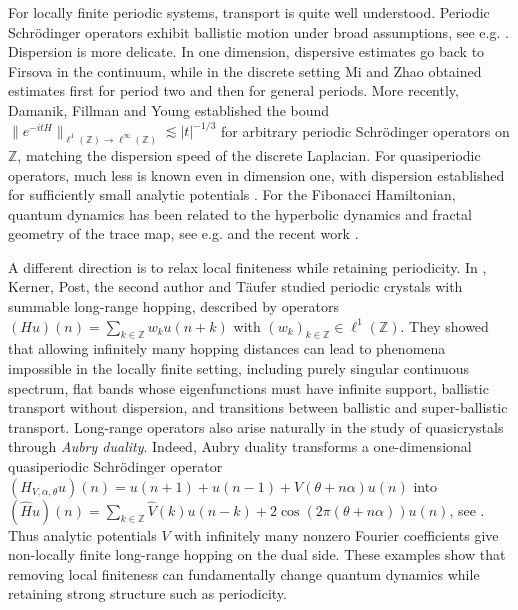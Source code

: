 \documentclass[11pt]{amsart}
\theoremstyle{plain}
\theoremstyle{definition}
\numberwithin{equation}{section}
\begin{document}
For locally finite periodic systems, transport is quite well understood. Periodic Schr\"odinger operators exhibit ballistic motion under broad assumptions, see e.g. \cite{DamanikLukicYessen,FillmanPeriodic,BoutetdeMonvelSabri}. Dispersion is more delicate. In one dimension, dispersive estimates go back to Firsova \cite{Firsova} in the continuum, while in the discrete setting Mi and Zhao \cite{MiZhao1,MiZhao2} obtained estimates first for period two and then for general periods. More recently, Damanik, Fillman and Young \cite{DamanikFillmanYoung} established the bound $\|e^{-itH}\|_{\ell^1(\mathbb Z)\to\ell^\infty(\mathbb Z)}\lesssim |t|^{-1/3}$ for arbitrary periodic Schr\"odinger operators on $\mathbb Z$, matching the dispersion speed of the discrete Laplacian. For quasiperiodic operators, much less is known even in dimension one, with dispersion established for sufficiently small analytic potentials \cite{BZ20}. For the Fibonacci Hamiltonian, quantum dynamics has been related to the hyperbolic dynamics and fractal geometry of the trace map, see e.g. \cite{DamanikTcheremchantsev,DamanikGorodetski,DamanikGorodetskiYessen} and the recent work \cite{Leclerc2}.

A different direction is to relax local finiteness while retaining periodicity. In \cite{KernerPostSabriTaufer}, Kerner, Post, the second author and T\"aufer studied periodic crystals with summable long-range hopping, described by operators $(Hu)(n)=\sum_{k\in\mathbb Z}w_k u(n+k)$ with $(w_k)_{k\in\mathbb Z}\in\ell^1(\mathbb Z)$. They showed that allowing infinitely many hopping distances can lead to phenomena impossible in the locally finite setting, including purely singular continuous spectrum, flat bands whose eigenfunctions must have infinite support, ballistic transport without dispersion, and transitions between ballistic and super-ballistic transport. Long-range operators also arise naturally in the study of quasicrystals through \textit{Aubry duality}. Indeed, Aubry duality transforms a one-dimensional quasiperiodic Schr\"odinger operator $(H_{V,\alpha,\theta}u)(n)=u(n+1)+u(n-1)+V(\theta+n\alpha)u(n)$ into $(\widehat H u)(n)=\sum_{k\in\mathbb Z}\widehat V(k)u(n-k)+2\cos(2\pi(\theta+n\alpha))u(n)$, see \cite{AvilaJitomirskaya,HaroPuig}. Thus analytic potentials $V$ with infinitely many nonzero Fourier coefficients give non-locally finite long-range hopping on the dual side. These examples show that removing local finiteness can fundamentally change quantum dynamics while retaining strong structure such as periodicity.
\end{document}
